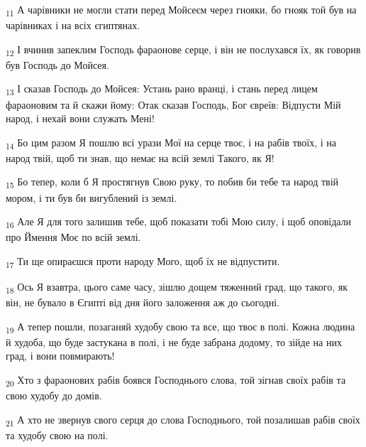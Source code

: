 \begin{tcolorbox}
\textsubscript{11} А чарівники не могли стати перед Мойсеєм через гнояки, бо гнояк той був на чарівниках і на всіх єгиптянах.
\end{tcolorbox}
\begin{tcolorbox}
\textsubscript{12} І вчинив запеклим Господь фараонове серце, і він не послухався їх, як говорив був Господь до Мойсея.
\end{tcolorbox}
\begin{tcolorbox}
\textsubscript{13} І сказав Господь до Мойсея: Устань рано вранці, і стань перед лицем фараоновим та й скажи йому: Отак сказав Господь, Бог євреїв: Відпусти Мій народ, і нехай вони служать Мені!
\end{tcolorbox}
\begin{tcolorbox}
\textsubscript{14} Бо цим разом Я пошлю всі урази Мої на серце твоє, і на рабів твоїх, і на народ твій, щоб ти знав, що немає на всій землі Такого, як Я!
\end{tcolorbox}
\begin{tcolorbox}
\textsubscript{15} Бо тепер, коли б Я простягнув Свою руку, то побив би тебе та народ твій мором, і ти був би вигублений із землі.
\end{tcolorbox}
\begin{tcolorbox}
\textsubscript{16} Але Я для того залишив тебе, щоб показати тобі Мою силу, і щоб оповідали про Ймення Моє по всій землі.
\end{tcolorbox}
\begin{tcolorbox}
\textsubscript{17} Ти ще опираєшся проти народу Мого, щоб їх не відпустити.
\end{tcolorbox}
\begin{tcolorbox}
\textsubscript{18} Ось Я взавтра, цього саме часу, зішлю дощем тяженний град, що такого, як він, не бувало в Єгипті від дня його заложення аж до сьогодні.
\end{tcolorbox}
\begin{tcolorbox}
\textsubscript{19} А тепер пошли, позаганяй худобу свою та все, що твоє в полі. Кожна людина й худоба, що буде застукана в полі, і не буде забрана додому, то зійде на них град, і вони повмирають!
\end{tcolorbox}
\begin{tcolorbox}
\textsubscript{20} Хто з фараонових рабів боявся Господнього слова, той зігнав своїх рабів та свою худобу до домів.
\end{tcolorbox}
\begin{tcolorbox}
\textsubscript{21} А хто не звернув свого серця до слова Господнього, той позалишав рабів своїх та худобу свою на полі.
\end{tcolorbox}
